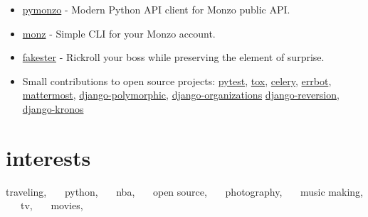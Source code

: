 \documentclass[]{cv-style}  %
\begin{document}
\begin{itemize}
  \item \href{https://github.com/pawelad/pymonzo}{pymonzo} - Modern Python API client for Monzo public API.
  \item \href{https://github.com/pawelad/monz}{monz} - Simple CLI for your Monzo account.
  \item \href{https://github.com/pawelad/fakester}{fakester} - Rickroll your boss while preserving the element of surprise.
  \item Small contributions to open source projects: \href{https://github.com/pytest-dev/pytest}{pytest}, \href{https://github.com/tox-dev/tox}{tox}, \href{https://github.com/celery/celery}{celery}, \href{https://github.com/errbotio/errbot}{errbot}, \href{https://github.com/mattermost/mattermost}{mattermost}, \href{https://github.com/jazzband/django-polymorphic}{django-polymorphic}, \href{https://github.com/bennylope/django-organizations}{django-organizations} \href{https://github.com/etianen/django-reversion}{django-reversion}, \href{https://github.com/jgorset/django-kronos}{django-kronos}
\end{itemize}

\vspace{-0.25cm}


\section{interests}
  \vspace{-0.25cm}

traveling, \ \ \ python, \ \ \ nba, \ \ \ open source, \ \ \ photography, \ \ \ music making, \ \ \ tv, \ \ \ movies, \ \ \

\vspace{-0.6cm}
\end{document}
